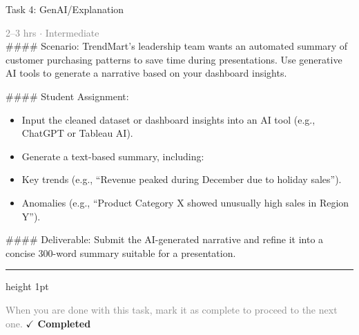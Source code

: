 \documentclass[10pt,a4paper]{article}
\begin{document}
\begin{taskbox}{Task 4: GenAI/Explanation}

    {\small \textcolor{gray}{2--3 hrs $\cdot$ Intermediate}}\\[12pt]

    \#\#\#\# Scenario:
TrendMart’s leadership team wants an automated summary of customer purchasing patterns to save time during presentations. Use generative AI tools to generate a narrative based on your dashboard insights.

\#\#\#\# Student Assignment:
\begin{itemize}
    \item Input the cleaned dataset or dashboard insights into an AI tool (e.g., ChatGPT or Tableau AI).
    \item Generate a text-based summary, including:
    \item Key trends (e.g., “Revenue peaked during December due to holiday sales”).
    \item Anomalies (e.g., “Product Category X showed unusually high sales in Region Y”).
\end{itemize}

\#\#\#\# Deliverable:
Submit the AI-generated narrative and refine it into a concise 300-word summary suitable for a presentation.\par

    \vspace{16pt}

    \textcolor{cardBorder}{\hrule height 1pt}\vspace{8pt}

    \small \textcolor{gray}{When you are done with this task, mark it as complete to proceed to the next one.} \hfill \textbf{\textcolor{brandDark}{$\checkmark$ Completed}}

\end{taskbox}
\end{document}
